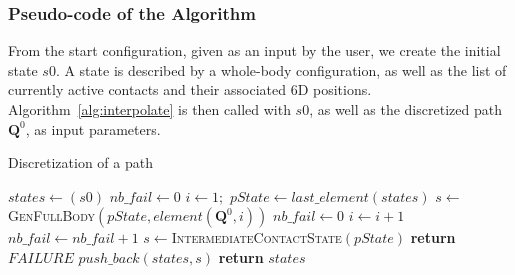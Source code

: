 \subsubsection{Pseudo-code of the Algorithm}
\label{app:contact}



From the start configuration, given as an input by the user,
we create the initial state $s0$. A state is described by a whole-body configuration, as well as the list of currently active contacts and their associated 6D positions.
Algorithm~\ref{alg:interpolate}  is then called with $s0$, as well as the discretized path 
$\mathbf{Q}^0$, as input parameters.

\begin{algorithm}[!tbp]
\caption{Discretization of a path} \label{interpolate}
	\begin{algorithmic}[1]
		\State $states \gets (s0)$ 
		\State $nb\_fail \gets 0$ 
		\State $i \gets 1;$ 
			\State $pState \gets last\_element(states)$
			\State $s \gets$ \textsc{GenFullBody}$(pState, element(\mathbf{Q}^0,i))$
				\State $nb\_fail \gets 0$
				\State $i \gets i+1$
			\Else
				\State $nb\_fail \gets nb\_fail + 1$
				\State $s \gets $\textsc{IntermediateContactState}$(pState)$
					\State \textbf{return} $FAILURE$
				\EndIf		
			\EndIf
			\State $push\_back(states, s)$
		\EndWhile
		\State \textbf{return} $states$
	\EndFunction
\end{algorithmic}
\label{alg:interpolate}
\end{algorithm}

